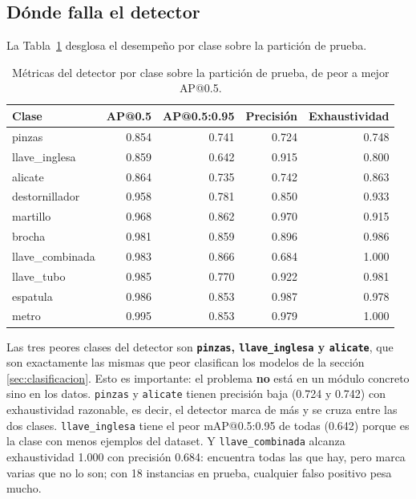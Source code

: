 \documentclass[11pt,a4paper]{article}
\newcommand{\clase}[1]{\texttt{#1}}
\begin{document}
\subsection{Dónde falla el detector}

La Tabla~\ref{tab:apclase} desglosa el desempeño por clase sobre la partición de prueba.

\begin{table}[htbp]
\centering
\caption{Métricas del detector por clase sobre la partición de prueba, de peor a mejor AP@0.5.}
\label{tab:apclase}
\small
\begin{tabular}{@{}lrrrr@{}}
\toprule
\textbf{Clase} & \textbf{AP@0.5} & \textbf{AP@0.5:0.95} & \textbf{Precisión} & \textbf{Exhaustividad} \\
\midrule
pinzas           & 0.854 & 0.741 & 0.724 & 0.748 \\
llave\_inglesa   & 0.859 & 0.642 & 0.915 & 0.800 \\
alicate          & 0.864 & 0.735 & 0.742 & 0.863 \\
destornillador   & 0.958 & 0.781 & 0.850 & 0.933 \\
martillo         & 0.968 & 0.862 & 0.970 & 0.915 \\
brocha           & 0.981 & 0.859 & 0.896 & 0.986 \\
llave\_combinada & 0.983 & 0.866 & 0.684 & 1.000 \\
llave\_tubo      & 0.985 & 0.770 & 0.922 & 0.981 \\
espatula         & 0.986 & 0.853 & 0.987 & 0.978 \\
metro            & 0.995 & 0.853 & 0.979 & 1.000 \\
\bottomrule
\end{tabular}
\end{table}

Las tres peores clases del detector son \textbf{\clase{pinzas}, \clase{llave\_inglesa} y
\clase{alicate}}, que son exactamente las mismas que peor clasifican los modelos de la sección
\ref{sec:clasificacion}. Esto es importante: el problema \textbf{no} está en un módulo concreto
sino en los datos. \clase{pinzas} y \clase{alicate} tienen precisión baja (0.724 y 0.742) con
exhaustividad razonable, es decir, el detector marca de más y se cruza entre las dos clases.
\clase{llave\_inglesa} tiene el peor mAP@0.5:0.95 de todas (0.642) porque es la clase con menos
ejemplos del dataset. Y \clase{llave\_combinada} alcanza exhaustividad 1.000 con precisión 0.684:
encuentra todas las que hay, pero marca varias que no lo son; con 18 instancias en prueba,
cualquier falso positivo pesa mucho.
\end{document}
